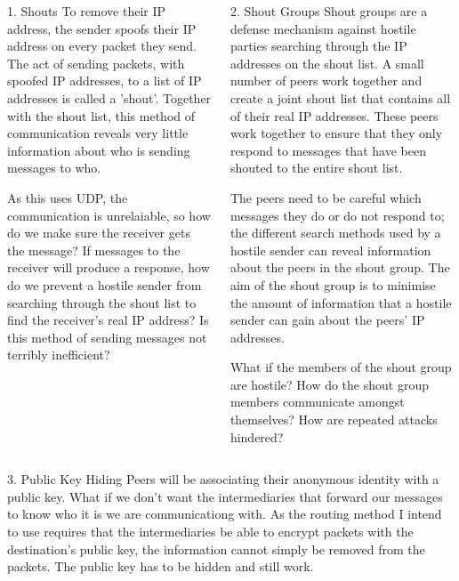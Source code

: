 \documentclass[ %
                    author={Luke Murray},
                supervisor={Dr. Simon Hollis},
                     title={Shadow Peer-to-Peer Networks},
                  subtitle={},
                    degree={MEng},
                      year={2013} ]{poster}
\begin{document}
\begin{frame}{}
\begin{columns}[t]
\begin{column}{0.422\linewidth}
\begin{block}{\Large 1. Shouts}
    To remove their IP address, the sender spoofs their IP address on every packet they send. The act of sending packets, with spoofed IP addresses, to a list of IP addresses is called a 'shout'. Together with the shout list, this method of communication reveals very little information about who is sending messages to who.


    As this uses UDP, the communication is unrelaiable, so how do we make sure the receiver gets the message? If messages to the receiver will produce a response, how do we prevent a hostile sender from searching through the shout list to find the receiver's real IP address? Is this method of sending messages not terribly inefficient?

    \end{block}
    \end{column}

    \begin{column}{0.422\linewidth}
    \begin{block}{\Large 2. Shout Groups}
    Shout groups are a defense mechanism against hostile parties searching through the IP addresses on the shout list. A small number of peers work together and create a joint shout list that contains all of their real IP addresses. These peers work together to ensure that they only respond to messages that have been shouted to the entire shout list.
    
    
    The peers need to be careful which messages they do or do not respond to; the different search methods used by a hostile sender can reveal information about the peers in the shout group. The aim of the shout group is to minimise the amount of information that a hostile sender can gain about the peers' IP addresses.
    
    What if the members of the shout group are hostile? How do the shout group members communicate amongst themselves? How are repeated attacks hindered?
    \end{block}
    \end{column}
\end{columns}

\vfill

\begin{columns}[t]
    \begin{column}{0.422\linewidth}
    \begin{block}{\Large 3. Public Key Hiding}
    Peers will be associating their anonymous identity with a public key. What if we don't want the intermediaries that forward our messages to know who it is we are communicationg with. As the routing method I intend to use requires that the intermediaries be able to encrypt packets with the destination's public key, the information cannot simply be removed from the packets. The public key has to be hidden and still work.
    

\end{block}
\end{column}
\end{columns}
\end{frame}
\end{document}
